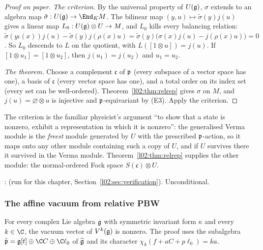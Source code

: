 \begin{proof}[Proof on paper]
\emph{The criterion.} By the universal property of $U(\mathfrak{g})$, $\sigma$ extends to an algebra map
$\tilde\sigma : U(\ltwog)\to\End_K M$. The bilinear map $(y,u)\mapsto\tilde\sigma(y)j(u)$ gives a linear map
$L_0 : U(\mathfrak{g})\otimes U\to M$, and $L_0$ kills every balancing relation:
$\tilde\sigma(y\iota(x))j(u) - \tilde\sigma(y)j(\rho(x)u) = \tilde\sigma(y)\bigl(\sigma(x)j(u) - j(\rho(x)u)\bigr) = 0$. So $L_0$
descends to $L$ on the quotient, with $L([1\otimes u]) = j(u)$. If $[1\otimes u_1] = [1\otimes u_2]$, then
$j(u_1) = j(u_2)$ and $u_1 = u_2$.

\emph{The theorem.} Choose a complement $\mathfrak c$ of $\mathfrak{p}$ (every subspace of a vector space has one), a
basis of $\mathfrak c$ (every vector space has one), and a total order on its index set (every set can be
well-ordered). Theorem~\ref{l02:thm:relrep} gives $\sigma$ on $M$, and $j(u) = \varnothing\otimes u$ is
injective and $\mathfrak{p}$-equivariant by (E3). Apply the criterion.
\end{proof}

\begin{physics}
The criterion is the familiar physicist's argument ``to show that a state is nonzero, exhibit a
representation in which it is nonzero'': the generalised Verma module is the \emph{freest} module
generated by $U$ with the prescribed $\mathfrak{p}$-action, so it maps onto any other module containing such a
copy of $U$, and if $U$ survives there it survived in the Verma module. Theorem~\ref{l02:thm:relrep}
supplies the other module: the normal-ordered Fock space $S(\mathfrak c)\otimes U$.
\end{physics}

\begin{status}
\allowbreak{}\allowbreak{}\allowbreak{}: 
(run for this chapter, Section~\ref{l02:sec:verification}). Unconditional.
\end{status}

\subsubsection{The affine vacuum from relative PBW}

\begin{theorem}\label{l02:thm:vacind}
For every complex Lie algebra $\mathfrak{g}$ with symmetric invariant form $\kappa$ and every $k\in\C$, the vacuum
vector of $V^k(\mathfrak{g})$ is nonzero. The proof uses the subalgebra
$\hat{\ltwop} = \ltwog[t]\oplus\C C\oplus\C\ell_0$ of $\widehat{\mathfrak{g}}$ and its character $\chi_k(f + aC + p\ell_0) = ka$.
\end{theorem}

